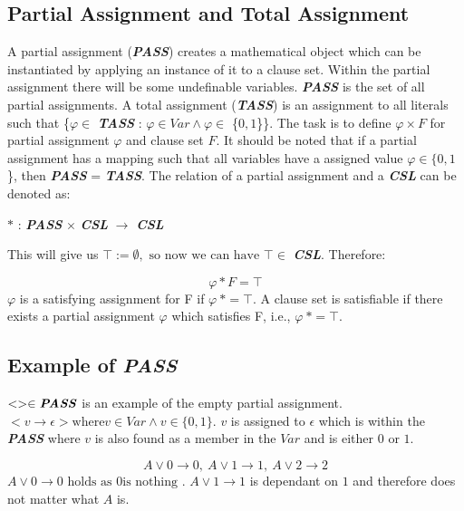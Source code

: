 \documentclass[11pt,a4paper]{report}
\begin{document}
\subsection {Partial Assignment and Total Assignment}
\label{sec:pata}

A partial assignment (\textbf{\textit{PASS}}) creates a mathematical object which can be instantiated by applying an instance of it to a clause set. Within the partial assignment there will be some undefinable variables. \textbf{\textit{PASS}} is the set of all partial assignments. 
A total assignment (\textbf{\textit{TASS}}) is an assignment to all literals such that \{$\varphi \in$ \textbf{\textit{TASS}} : $\varphi \in Var \land \varphi \in$ \{$0,1$\}\}. The task is to define $\varphi \times F$ for partial assignment $\varphi$ and clause set $F$. It should be noted that if a partial assignment has a mapping such that all variables have a assigned value $\varphi \in \{0,1$\}, then \textbf{\textit{PASS}} = \textbf{\textit{TASS}}. 
The relation of a partial assignment and a \textbf{\textit{CSL}} can be denoted as: 

\begin{center}
$\ast$ : \textbf{\textit{PASS}} $\times$ \textbf{\textit{CSL}} $\rightarrow$ \textbf{\textit{CSL}}
\end{center}
This will give us $\top:= \emptyset, \text{ so now we can have } \top \in$ \textbf{\textit{CSL}}. Therefore:

\begin{displaymath}
\varphi \ast F = \top
\end{displaymath}
$\varphi$ is a satisfying assignment for F if $\varphi \: \ast = \top$. A clause set is satisfiable if there exists a partial assignment $\varphi$ which satisfies F, i.e., $\varphi \: \ast = \top$. 

\subsection{Example of \textbf{\textit{PASS}}}
$<> \in \textbf{\textit{PASS}}$ is an example of the empty partial assignment.
$< v \rightarrow \epsilon > \text{where} v \in Var \land v \in \{0,1\}$. $v$ is assigned to $\epsilon$ which is within the \textbf{\textit{PASS}} where $v$ is also found as a member in the $Var$ and is either $0$ or $1$. 

\begin{displaymath}
A \lor 0 \rightarrow 0, \: A \lor 1 \rightarrow 1, \: A \lor 2 \rightarrow 2
\end{displaymath}
$A \lor 0 \rightarrow 0 \text{ holds as }0 \text {is nothing }$. $A \lor 1 \rightarrow 1$ is dependant on $1$ and therefore does not matter what $A$ is.
\end{document}
